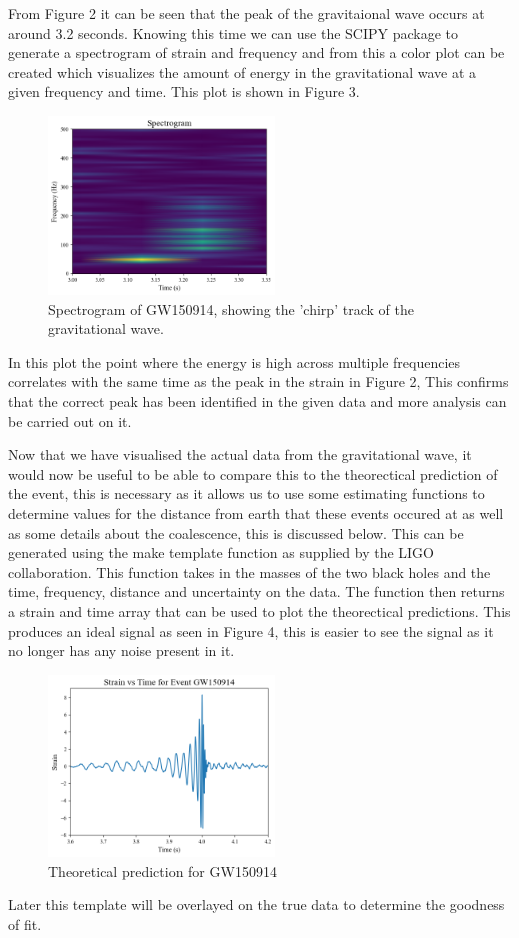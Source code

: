 \documentclass{article}
\begin{document}
From Figure 2 it can be seen that the peak of the gravitaional wave occurs at
around 3.2 seconds.
Knowing this time we can use the SCIPY package to generate a spectrogram of strain and frequency and from this a color plot can be
created which visualizes the amount of energy in the gravitational wave at a given
frequency and time. This plot is shown in Figure 3.
\begin{figure}[h]
    \includegraphics[width=6cm]{images/spectrogram_gw150914.png}
    \caption{Spectrogram of GW150914, showing the 'chirp' track of the gravitational wave.}
    \label{fig:spectrogram}
\end{figure}
\newline
In this plot the point where the energy is high across multiple frequencies
correlates with the same time as the peak in the strain in Figure 2, This confirms that the correct peak has been identified
in the given data and more analysis can be carried out on it.

Now that we have visualised the actual data from the gravitational wave, it would now
be useful to be able to compare this to the theorectical prediction of the event, this is necessary as it allows us
to use some estimating functions to determine values for the distance from earth that these events occured at as well as some
details about the coalescence, this is discussed below.
This can be generated using the make template function as supplied by the LIGO
collaboration. This function takes in the masses of the two black holes and
the time, frequency, distance and uncertainty on the data. The function then returns
a strain and time array that can be used to plot the theorectical predictions.
This produces an ideal signal as seen in Figure 4, this is easier to see the signal as
it no longer has any noise present in it.
\begin{figure}[h]
    \includegraphics[width=6cm]{images/ideal_signal_gw150914.png}
    \caption{Theoretical prediction for GW150914}
    \label{fig:ideal_signal}
\end{figure}
\newline
Later this template will be overlayed on the true data to determine the goodness of fit.
\end{document}
